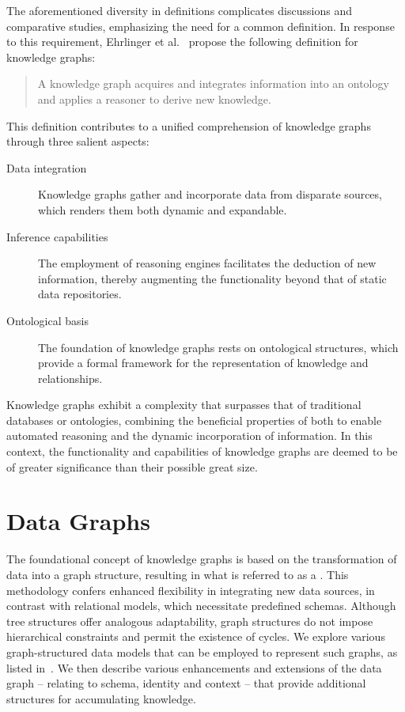 The aforementioned diversity in definitions complicates discussions and comparative studies, emphasizing the need for a common definition. In response to this requirement, Ehrlinger et al.~\cite{Ehrlinger2016TowardsAD} propose the following definition for knowledge graphs:
\begin{center}
    \begin{quote}
        A knowledge graph acquires and integrates information into an ontology and applies a reasoner to derive new knowledge.
    \end{quote}
\end{center}
This definition contributes to a unified comprehension of knowledge graphs through three salient aspects:
\begin{description}
    \item[Data integration] Knowledge graphs gather and incorporate data from disparate sources, which renders them both dynamic and expandable.
    \item[Inference capabilities] The employment of reasoning engines facilitates the deduction of new information, thereby augmenting the functionality beyond that of static data repositories.
    \item[Ontological basis] The foundation of knowledge graphs rests on ontological structures, which provide a formal framework for the representation of knowledge and relationships.
\end{description}

Knowledge graphs exhibit a complexity that surpasses that of traditional databases or ontologies, combining the beneficial properties of both to enable automated reasoning and the dynamic incorporation of information. In this context, the functionality and capabilities of knowledge graphs are deemed to be of greater significance than their possible great size.

\section{Data Graphs}\label{data-graphs}
The foundational concept of knowledge graphs is based on the transformation of data into a graph structure, resulting in what is referred to as a . This methodology confers enhanced flexibility in integrating new data sources, in contrast with relational models, which necessitate predefined schemas. Although tree structures offer analogous adaptability, graph structures do not impose hierarchical constraints and permit the existence of cycles. We explore  various graph-structured data models that can be employed to represent such graphs, as listed in~\cite{Hogan2021KGs}. We then describe various enhancements and extensions of the data graph – relating to schema, identity and context – that provide additional structures for accumulating knowledge.

